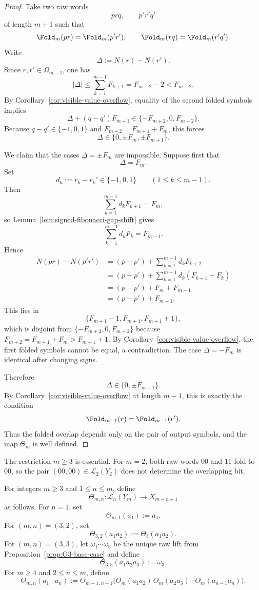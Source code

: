 \begin{proof}
Take two raw words
\[
prq,\qquad p'r'q'
\]
of length $m+1$ such that
\[
\Fold_m(pr)=\Fold_m(p'r'),
\qquad
\Fold_m(rq)=\Fold_m(r'q').
\]
Write
\[
\Delta:=N(r)-N(r').
\]
Since $r,r'\in\Omega_{m-1}$, one has
\[
|\Delta|\le \sum_{k=1}^{m-1}F_{k+1}=F_{m+2}-2<F_{m+2}.
\]
By Corollary~\ref{cor:visible-value-overflow}, equality of the second folded
symbols implies
\[
\Delta+(q-q')F_{m+1}\in\{-F_{m+2},0,F_{m+2}\}.
\]
Because $q-q'\in\{-1,0,1\}$ and $F_{m+2}=F_{m+1}+F_m$, this forces
\[
\Delta\in\{0,\pm F_m,\pm F_{m+1}\}.
\]

We claim that the cases $\Delta=\pm F_m$ are impossible.  Suppose first that
\[
\Delta=F_m.
\]
Set
\[
d_k:=r_k-r_k'\in\{-1,0,1\}
\qquad (1\le k\le m-1).
\]
Then
\[
\sum_{k=1}^{m-1} d_kF_{k+1}=F_m,
\]
so Lemma~\ref{lem:signed-fibonacci-gap-shift} gives
\[
\sum_{k=1}^{m-1} d_kF_k=F_{m-1}.
\]
Hence
\[
\begin{aligned}
N(pr)-N(p'r')
&=
(p-p')+\sum_{k=1}^{m-1} d_kF_{k+2}\\
&=
(p-p')+\sum_{k=1}^{m-1} d_k(F_{k+1}+F_k)\\
&=
(p-p')+F_m+F_{m-1}\\
&=
(p-p')+F_{m+1}.
\end{aligned}
\]
This lies in
\[
\{F_{m+1}-1,F_{m+1},F_{m+1}+1\},
\]
which is disjoint from $\{-F_{m+2},0,F_{m+2}\}$ because
$F_{m+2}=F_{m+1}+F_m>F_{m+1}+1$.  By
Corollary~\ref{cor:visible-value-overflow}, the first folded symbols cannot be
equal, a contradiction.  The case $\Delta=-F_m$ is identical after changing
signs.

Therefore
\[
\Delta\in\{0,\pm F_{m+1}\}.
\]
By Corollary~\ref{cor:visible-value-overflow} at length $m-1$, this is exactly
the condition
\[
\Fold_{m-1}(r)=\Fold_{m-1}(r').
\]
Thus the folded overlap depends only on the pair of output symbols, and the map
$\Theta_m$ is well defined.
\end{proof}

\begin{remark}
The restriction $m\ge 3$ is essential.  For $m=2$, both raw words $00$ and
$11$ fold to $00$, so the pair $(00,00)\in\mathcal L_2(Y_2)$ does not
determine the overlapping bit.
\end{remark}

\begin{definition}
\label{def:recursive-overlap-decoder}
For integers $m\ge 3$ and $1\le n\le m$, define
\[
\Theta_{m,n}:\mathcal L_n(Y_m)\to X_{m-n+1}
\]
as follows.  For $n=1$, set
\[
\Theta_{m,1}(a_1):=a_1.
\]
For $(m,n)=(3,2)$, set
\[
\Theta_{3,2}(a_1a_2):=\Theta_3(a_1a_2).
\]
For $(m,n)=(3,3)$, let $\omega_1\cdots\omega_5$ be the unique raw lift from
Proposition~\ref{prop:G3-base-case} and define
\[
\Theta_{3,3}(a_1a_2a_3):=\omega_3.
\]
For $m\ge 4$ and $2\le n\le m$, define
\[
\Theta_{m,n}(a_1\cdots a_n)
:=
\Theta_{m-1,n-1}\bigl(
\Theta_m(a_1a_2)\,
\Theta_m(a_2a_3)\cdots
\Theta_m(a_{n-1}a_n)
\bigr).
\]
\end{definition}

